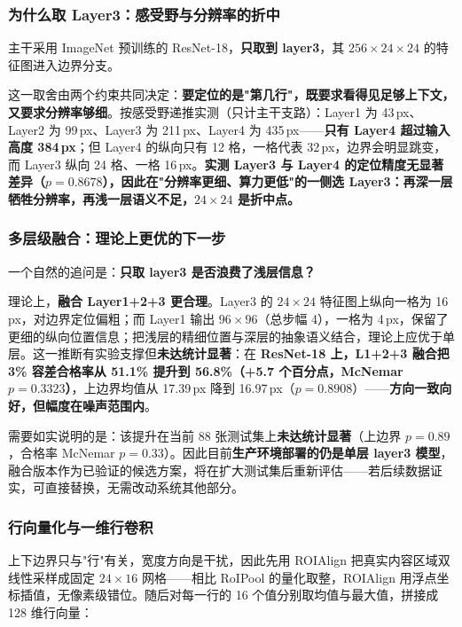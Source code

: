 \documentclass[UTF8,a4paper,10pt]{ctexart}
\begin{document}
\subsubsection{为什么取 Layer3：感受野与分辨率的折中}

主干采用 ImageNet 预训练的 ResNet-18\cite{he2016resnet}，\textbf{只取到 layer3}，其 $256\times24\times24$ 的特征图进入边界分支。

这一取舍由两个约束共同决定：\textbf{要定位的是"第几行"，既要求看得见足够上下文，又要求分辨率够细}。按感受野递推实测（只计主干支路）：Layer1 为 43\,px、Layer2 为 99\,px、Layer3 为 211\,px、Layer4 为 435\,px——\textbf{只有 Layer4 超过输入高度 384\,px}；但 Layer4 的纵向只有 12 格，一格代表 32\,px，边界会明显跳变，而 Layer3 纵向 24 格、一格 16\,px。\textbf{实测 Layer3 与 Layer4 的定位精度无显著差异（$p=0.8678$），因此在"分辨率更细、算力更低"的一侧选 Layer3：再深一层牺牲分辨率，再浅一层语义不足，$24\times24$ 是折中点。}

\subsubsection{多层级融合：理论上更优的下一步}

一个自然的追问是：\textbf{只取 layer3 是否浪费了浅层信息？}

理论上，\textbf{融合 Layer1+2+3 更合理}。Layer3 的 $24\times24$ 特征图上纵向一格为 16\,px，对边界定位偏粗；而 Layer1 输出 $96\times96$（总步幅 4），一格为 4\,px，保留了更细的纵向位置信息；把浅层的精细位置与深层的抽象语义结合，理论上应优于单层。这一推断有实验支撑但\textbf{未达统计显著}：在 \textbf{ResNet-18 上，L1+2+3 融合把 3\% 容差合格率从 51.1\% 提升到 56.8\%（+5.7 个百分点，McNemar $p=0.3323$）}，上边界均值从 17.39\,px 降到 16.97\,px（$p=0.8908$）——\textbf{方向一致向好，但幅度在噪声范围内}。

需要如实说明的是：该提升在当前 88 张测试集上\textbf{未达统计显著}（上边界 $p=0.89$，合格率 McNemar $p=0.33$）。因此目前\textbf{生产环境部署的仍是单层 layer3 模型}，融合版本作为已验证的候选方案，将在扩大测试集后重新评估——若后续数据证实，可直接替换，无需改动系统其他部分。

\subsubsection{行向量化与一维行卷积}

上下边界只与"行"有关，宽度方向是干扰，因此先用 ROIAlign 把真实内容区域双线性采样成固定 $24\times16$ 网格——相比 RoIPool 的量化取整，ROIAlign 用浮点坐标插值，无像素级错位。随后对每一行的 16 个值分别取均值与最大值，拼接成 128 维行向量：
\end{document}
